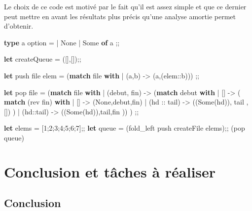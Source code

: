 \documentclass[
  12pt,
]{article}
\newenvironment{Shaded}{}{}
\newcommand{\DataTypeTok}[1]{\textcolor[rgb]{0.56,0.13,0.00}{#1}}
\newcommand{\DecValTok}[1]{\textcolor[rgb]{0.25,0.63,0.44}{#1}}
\newcommand{\KeywordTok}[1]{\textcolor[rgb]{0.00,0.44,0.13}{\textbf{#1}}}
\newcommand{\NormalTok}[1]{#1}
\begin{document}
Le choix de ce code est motivé par le fait qu'il est assez simple et que
ce dernier peut mettre en avant les résultats plus précis qu'une analyse
amortie permet d'obtenir.

\begin{Shaded}
  \begin{Highlighting}[]
    \KeywordTok{type}\NormalTok{ \textquotesingle{}a }\DataTypeTok{option}\NormalTok{ =}
    \NormalTok{  | }\DataTypeTok{None}
    \NormalTok{  | }\DataTypeTok{Some} \KeywordTok{of}\NormalTok{ \textquotesingle{}a}
    \NormalTok{  ;;}

    \KeywordTok{let}\NormalTok{ createQueue = ([],[]);;}

    \KeywordTok{let}\NormalTok{ push file elem = }
    \NormalTok{  (}\KeywordTok{match}\NormalTok{ file }\KeywordTok{with}
    \NormalTok{  | (a,b) {-}\textgreater{} (a,(elem::b)))}
    \NormalTok{  ;;}

    \KeywordTok{let}\NormalTok{ pop file =}
    \NormalTok{    (}\KeywordTok{match}\NormalTok{ file }\KeywordTok{with}
    \NormalTok{    | (debut, fin) {-}\textgreater{} }
    \NormalTok{      (}\KeywordTok{match}\NormalTok{ debut }\KeywordTok{with}
    \NormalTok{      | [] {-}\textgreater{} (}
    \KeywordTok{match}\NormalTok{ (rev fin) }\KeywordTok{with}
    \NormalTok{                | [] {-}\textgreater{} (}\DataTypeTok{None}\NormalTok{,debut,fin)}
    \NormalTok{                | (hd :: tail) {-}\textgreater{} ((}\DataTypeTok{Some}\NormalTok{(hd)), tail ,[])}
    \NormalTok{              )}
    \NormalTok{      | (hd::tail) {-}\textgreater{} ((}\DataTypeTok{Some}\NormalTok{(hd)),tail,fin ))}
    \NormalTok{    )}
    \NormalTok{  ;;}

    \KeywordTok{let}\NormalTok{ elems = [}\DecValTok{1}\NormalTok{;}\DecValTok{2}\NormalTok{;}\DecValTok{3}\NormalTok{;}\DecValTok{4}\NormalTok{;}\DecValTok{5}\NormalTok{;}\DecValTok{6}\NormalTok{;}\DecValTok{7}\NormalTok{];;}
    \KeywordTok{let}\NormalTok{ queue = (fold\_left push createFile elems);;}
    \NormalTok{  (pop queue)}
  \end{Highlighting}
\end{Shaded}

\hypertarget{conclusion-et-tuxe2ches-uxe0-ruxe9aliser}{%
  \section{Conclusion et tâches à
    réaliser}\label{conclusion-et-tuxe2ches-uxe0-ruxe9aliser}}

\hypertarget{conclusion}{%
  \subsection{Conclusion}\label{conclusion}}
\end{document}

